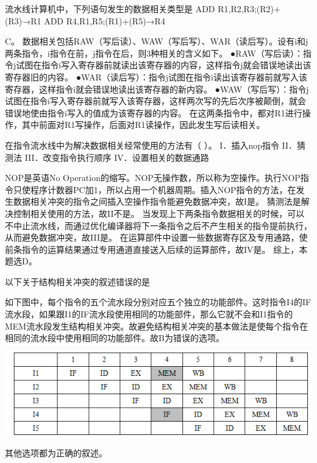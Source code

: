 \question 流水线计算机中，下列语句发生的数据相关类型是 ADD R1,R2,R3;(R2)+(R3)→R1
ADD R4,R1,R5;(R1)+(R5)→R4
\par{}
\begin{solution}C。
数据相关包括RAW（写后读）、WAW（写后写）、WAR（读后写）。设有i和j两条指令，i指令在前，j指令在后，则3种相关的含义如下。
●RAW（写后读）：指令j试图在指令i写入寄存器前就读出该寄存器的内容，这样指令j就会错误地读出该寄存器旧的内容。
●WAR（读后写）：指令j试图在指令i读出该寄存器前就写入该寄存器，这样指令i就会错误地读出该寄存器的新内容。
●WAW（写后写）：指令j试图在指令i写入寄存器前就写入该寄存器，这样两次写的先后次序被颠倒，就会错误地使由指令i写入的值成为该寄存器的内容。
在这两条指令中，都对R1进行操作，其中前面对R1写操作，后面对R1读操作，因此发生写后读相关。
\end{solution}
\question 在指令流水线中为解决数据相关经常使用的方法有（ ）。 I．插入nop指令
II．猜测法 III．改变指令执行顺序 IV．设置相关的数据通路
\par{}
\begin{solution}NOP是英语No
Operation的缩写。NOP无操作数，所以称为空操作。执行NOP指令只使程序计数器PC加1，所以占用一个机器周期。插入NOP指令的方法，在发生数据相关冲突的指令之间插入空操作指令能避免数据冲突，故I是。
猜测法是解决控制相关使用的方法，故II不是。
当发现上下两条指令数据相关的时候，可以不中止流水线，而通过优化编译器将下一条指令之后不产生相关的指令提前执行，从而避免数据冲突，故III是。
在运算部件中设置一些数据寄存区及专用通路，使前条指令的运算结果通过专用通道直接送入后续的运算部件，故IV是。
综上，本题选D。
\end{solution}
\question 以下关于结构相关冲突的叙述错误的是
\par{}
\begin{solution}如下图中，每个指令的五个流水段分别对应五个独立的功能部件。这时指令I4的IF流水段，如果跟I1的IF流水段使用相同的功能部件，那么它就不会和I1指令的MEM流水段发生结构相关冲突。故避免结构相关冲突的基本做法是使每个指令在相同的流水段中使用相同的功能部件。故B为错误的选项。
\includegraphics[width=6.06250in,height=1.71875in]{computerassets/fa5c1b2b874ee2b1d0efe52dadf7e098.png}
其他选项都为正确的叙述。
\end{solution}
